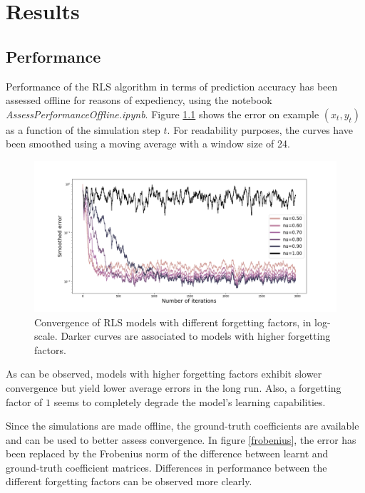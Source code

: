 \chapter{Results}

\section{Performance}

Performance of the RLS algorithm in terms of prediction accuracy
has been assessed offline for reasons of expediency,
using the notebook \textit{AssessPerformanceOffline.ipynb}.
Figure \ref{convergence} shows the error on example $(x_t, y_t)$
as a function of the simulation step $t$. For readability purposes,
the curves have been smoothed using a moving average with a window
size of 24.

\begin{figure}[H]
    \begin{center}
        \includegraphics[width=\textwidth, keepaspectratio]{imgs/convergence.png}
        \caption{Convergence of RLS models with different forgetting factors, in log-scale.
            Darker curves are associated to models with higher forgetting factors.}
        \label{convergence}
    \end{center}
\end{figure}

As can be observed, models with higher forgetting factors exhibit slower convergence
but yield lower average errors in the long run. Also, a forgetting factor of $1$
seems to completely degrade the model's learning capabilities.

Since the simulations are made offline, the ground-truth coefficients are available
and can be used to better assess convergence. In figure \ref{frobenius},
the error has been replaced by the Frobenius norm of the difference between learnt
and ground-truth coefficient matrices. Differences in performance between the different
forgetting factors can be observed more clearly.

